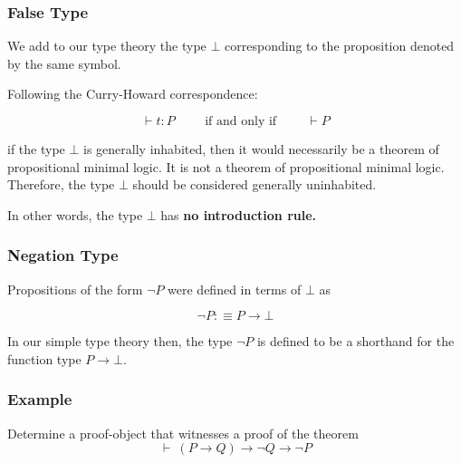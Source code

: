 \documentclass{beamer}
\theoremstyle{indentDefn} \newtheorem{defn}[]{Definition}
\begin{document}
\begin{frame}
  \frametitle{False Type}

  We add to our type theory the type $\bot$ corresponding to the proposition denoted by the same symbol. 

  \vspace{0.5cm}

  Following the Curry-Howard correspondence:
  
  $$ \vdash t : P \hspace{1cm} \text{if and only if} \hspace{1cm} \vdash P$$
  
  if the type $\bot$ is generally inhabited, then it would necessarily be a theorem of propositional minimal logic. It is not a theorem of propositional minimal logic. Therefore, the type $\bot$ should be considered generally uninhabited.

  \vspace{0.5cm}

  In other words, the type $\bot$ has {\bf no introduction rule.} 

\end{frame}

\begin{frame}
  \frametitle{Negation Type}

  Propositions of the form $\lnot P$ were defined in terms of $\bot$ as 

  $$\lnot P :\equiv P \to \bot$$

  In our simple type theory then, the type $\lnot P$ is defined to be a shorthand for the function type $P \to \bot$.  

  \vspace{4cm}

\end{frame}

\begin{frame}
  \frametitle{Example}

  Determine a proof-object that witnesses a proof of the theorem
  $$ \vdash \ (P \to Q) \to \lnot Q \to \lnot P$$

  \vspace{6cm}

\end{frame}
\end{document}
